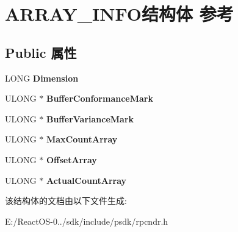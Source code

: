 \hypertarget{struct_a_r_r_a_y___i_n_f_o}{}\section{A\+R\+R\+A\+Y\+\_\+\+I\+N\+F\+O结构体 参考}
\label{struct_a_r_r_a_y___i_n_f_o}
\subsection*{Public 属性}
\begin{DoxyCompactItemize}
\item 
\mbox{\label{struct_a_r_r_a_y___i_n_f_o_af115001aec2561e9a078fbf391c4ae2b}} 
L\+O\+NG {\bfseries Dimension}
\item 
\mbox{\label{struct_a_r_r_a_y___i_n_f_o_aa9533ee99a23882222651d5c46d8b280}} 
U\+L\+O\+NG $\ast$ {\bfseries Buffer\+Conformance\+Mark}
\item 
\mbox{\label{struct_a_r_r_a_y___i_n_f_o_a3be4aa022eeb084eeb9450433f0a1f11}} 
U\+L\+O\+NG $\ast$ {\bfseries Buffer\+Variance\+Mark}
\item 
\mbox{\label{struct_a_r_r_a_y___i_n_f_o_a64995247e9d9a86f46c5d7bed6f1d012}} 
U\+L\+O\+NG $\ast$ {\bfseries Max\+Count\+Array}
\item 
\mbox{\label{struct_a_r_r_a_y___i_n_f_o_ac196e8283f57451a3098c6322af38bed}} 
U\+L\+O\+NG $\ast$ {\bfseries Offset\+Array}
\item 
\mbox{\label{struct_a_r_r_a_y___i_n_f_o_a5a5eefe7f8b7ca35bce357db4ad557a8}} 
U\+L\+O\+NG $\ast$ {\bfseries Actual\+Count\+Array}
\end{DoxyCompactItemize}


该结构体的文档由以下文件生成\+:\begin{DoxyCompactItemize}
\item 
E\+:/\+React\+O\+S-\/0../sdk/include/psdk/rpcndr.\+h\end{DoxyCompactItemize}
